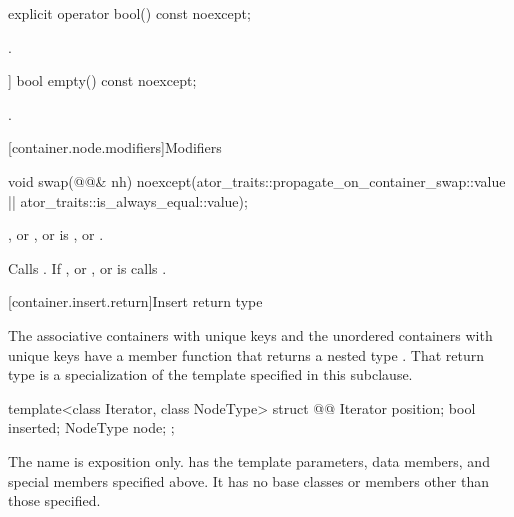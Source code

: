 \begin{itemdecl}
explicit operator bool() const noexcept;
\end{itemdecl}

\begin{itemdescr}
\pnum
\returns
{}.
\end{itemdescr}

\begin{itemdecl}
[[nodiscard]] bool empty() const noexcept;
\end{itemdecl}

\begin{itemdescr}
\pnum
\returns
{}.
\end{itemdescr}

[container.node.modifiers]{Modifiers}

\begin{itemdecl}
void swap(@@& nh)
  noexcept(ator_traits::propagate_on_container_swap::value ||
           ator_traits::is_always_equal::value);
\end{itemdecl}

\begin{itemdescr}
\pnum
\expects
{}, or , or
 is ,
or .

\pnum
\effects
Calls . If , or
, or 
is  calls .
\end{itemdescr}

[container.insert.return]{Insert return type}

\pnum
The associative containers with unique keys and the unordered containers with unique keys
have a member function  that returns a nested type .
That return type is a specialization of the template specified in this subclause.

\begin{codeblock}
template<class Iterator, class NodeType>
struct @@
{
  Iterator position;
  bool     inserted;
  NodeType node;
};
\end{codeblock}

\pnum
The name  is exposition only.
 has the template parameters,
data members, and special members specified above.
It has no base classes or members other than those specified.

